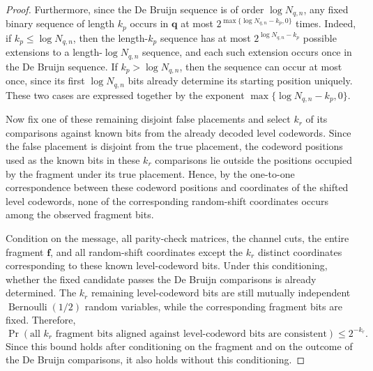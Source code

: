 \documentclass[journal,letterpaper,onecolumn,11pt]{IEEEtran}
\newcommand{\boldf}{\mathbf{f}}
\newcommand{\boldq}{\mathbf{q}}
\begin{document}
\begin{proof}
Furthermore, since the De Bruijn sequence is of order
\(\log N_{q,n}\), any fixed binary sequence of length \(k_p\) occurs
in \(\boldq\) at most
\(2^{\max\{\log N_{q,n}-k_p,0\}}\) times.
Indeed, if \(k_p\leq\log N_{q,n}\), then the length-\(k_p\) sequence
has at most \(2^{\log N_{q,n}-k_p}\) possible extensions to a
length-\(\log N_{q,n}\) sequence, and each such extension occurs once
in the De Bruijn sequence. If \(k_p>\log N_{q,n}\), then the sequence
can occur at most once, since its first \(\log N_{q,n}\) bits already
determine its starting position uniquely. These two cases are expressed
together by the exponent
\(\max\{\log N_{q,n}-k_p,0\}\).

Now fix one of these remaining disjoint false placements and select
\(k_r\) of its comparisons against known bits from the already decoded
level codewords. Since the false placement is disjoint from the true
placement, the codeword positions used as the known bits in these
\(k_r\) comparisons lie outside the positions occupied by the fragment
under its true placement. Hence, by the one-to-one correspondence
between these codeword positions and coordinates of the shifted level
codewords, none of the corresponding random-shift coordinates occurs
among the observed fragment bits.


Condition on the message, all parity-check matrices, the channel cuts,
the entire fragment \(\boldf\), and all random-shift coordinates except
the \(k_r\) distinct coordinates corresponding to these known
level-codeword bits. Under this conditioning, whether the fixed
candidate passes the De Bruijn comparisons is already determined.
The \(k_r\) remaining level-codeword bits are still mutually independent
\(\operatorname{Bernoulli}(1/2)\) random variables, while the
corresponding fragment bits are fixed. Therefore,
\[
\Pr\left(
\text{all \(k_r\) fragment bits aligned against level-codeword bits are consistent}
\right)
\leq 2^{-k_r}.
\]
Since this bound holds after conditioning on the fragment and on the
outcome of the De Bruijn comparisons, it also holds without this
conditioning.


\end{proof}
\end{document}
